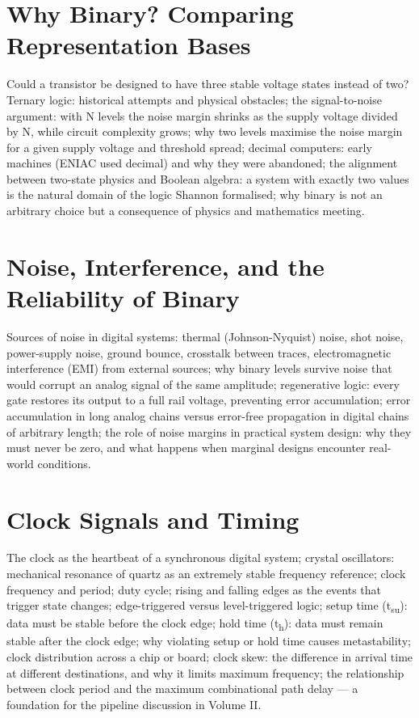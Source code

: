 \chapter{Why Binary? Comparing Representation Bases}
\label{ch:why-binary}

Could a transistor be designed to have three stable voltage states instead
of two? Ternary logic: historical attempts and physical obstacles;
the signal-to-noise argument: with N levels the noise margin shrinks as
the supply voltage divided by N, while circuit complexity grows; why two
levels maximise the noise margin for a given supply voltage and threshold
spread; decimal computers: early machines (ENIAC used decimal) and why
they were abandoned; the alignment between two-state physics and Boolean
algebra: a system with exactly two values is the natural domain of the
logic Shannon formalised; why binary is not an arbitrary choice but a
consequence of physics and mathematics meeting.

\chapter{Noise, Interference, and the Reliability of Binary}
\label{ch:noise-binary}

Sources of noise in digital systems: thermal (Johnson-Nyquist) noise,
shot noise, power-supply noise, ground bounce, crosstalk between traces,
electromagnetic interference (EMI) from external sources; why binary levels
survive noise that would corrupt an analog signal of the same amplitude;
regenerative logic: every gate restores its output to a full rail voltage,
preventing error accumulation; error accumulation in long analog chains
versus error-free propagation in digital chains of arbitrary length;
the role of noise margins in practical system design: why they must never
be zero, and what happens when marginal designs encounter real-world
conditions.

\chapter{Clock Signals and Timing}
\label{ch:clocks-timing}

The clock as the heartbeat of a synchronous digital system; crystal
oscillators: mechanical resonance of quartz as an extremely stable frequency
reference; clock frequency and period; duty cycle; rising and falling edges
as the events that trigger state changes; edge-triggered versus
level-triggered logic; setup time (t\textsubscript{su}): data must be
stable before the clock edge; hold time (t\textsubscript{h}): data must
remain stable after the clock edge; why violating setup or hold time
causes metastability; clock distribution across a chip or board; clock
skew: the difference in arrival time at different destinations, and why
it limits maximum frequency; the relationship between clock period and
the maximum combinational path delay — a foundation for the pipeline
discussion in Volume II.

